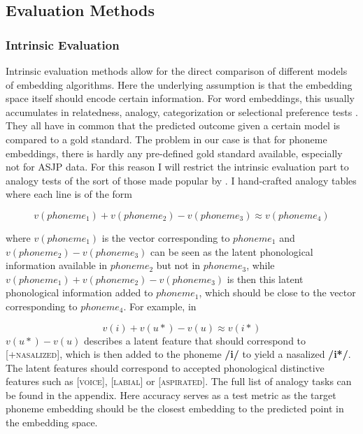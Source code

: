 \documentclass[11pt]{article}
\begin{document}
\subsection{Evaluation Methods}
\subsubsection{Intrinsic Evaluation}
Intrinsic evaluation methods allow for the direct comparison of different models of embedding algorithms. Here the underlying assumption is that the embedding space itself should encode certain information. For word embeddings, this usually accumulates in relatedness, analogy, categorization or selectional preference tests \cite{schnabel2015evaluation}. They all have in common that the predicted outcome given a certain model is compared to a gold standard. The problem in our case is that for phoneme embeddings, there is hardly any pre-defined gold standard available, especially not for ASJP data. For this reason I will restrict the intrinsic evaluation part to analogy tests of the sort of those made popular by \cite{mikolov2013distributed}. I hand-crafted analogy tables where each line is of the form 

\begin{equation}
v(phoneme_1) + v(phoneme_2) -  v(phoneme_3) \approx v(phoneme_4)
\end{equation}

where $v(phoneme_1)$ is the vector corresponding to $phoneme_1$ and $v(phoneme_2) - v(phoneme_3)$ can be seen as the latent phonological information available in $phoneme_2$ but not in $phoneme_3$,  while $v(phoneme_1) + v(phoneme_2) -  v(phoneme_3) $ is then this latent phonological information added to $phoneme_1$, which should be close to the vector corresponding to $phoneme_4$. For example, in

\begin{equation}
v(i) + v(u*) -  v(u) \approx v(i*)
\end{equation}
$v(u*) -  v(u)$ describes a latent feature that should correspond to \textsc{[+nasalized]}, which is then added to the phoneme \textbf{/i/} to yield a nasalized \textbf{/i*/}. The latent features should correspond to accepted phonological distinctive features such as \textsc{[voice]}, \textsc{[labial]} or \textsc{[aspirated]}. The full list of analogy tasks can be found in the appendix. 
Here accuracy serves as a test metric as the target phoneme embedding should be the closest embedding to the predicted point in the embedding space.
\end{document}

